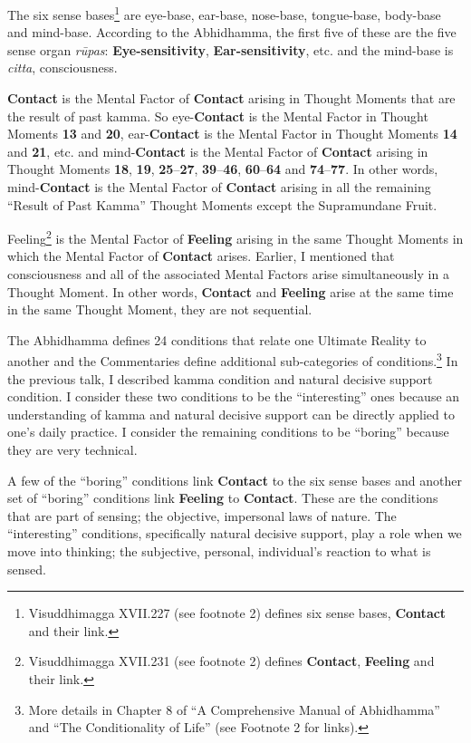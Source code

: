 The six sense bases\footnote{Visuddhimagga XVII.227 (see footnote 2) defines six sense bases, \textbf{Contact} and their link.} are eye-base, ear-base, nose-base, tongue-base, body-base and mind-base. According to the Abhidhamma, the first five of these are the five sense organ \textit{rūpas}: \textbf{Eye-sensitivity}, \textbf{Ear-sensitivity}, etc. and the mind-base is \textit{citta}, consciousness.

\textbf{Contact} is the Mental Factor of \textbf{Contact} arising in Thought Moments that are the result of past kamma. So eye-\textbf{Contact} is the Mental Factor in Thought Moments \textbf{13} and \textbf{20}, ear-\textbf{Contact} is the Mental Factor in Thought Moments \textbf{14} and \textbf{21}, etc. and mind-\textbf{Contact} is the Mental Factor of \textbf{Contact} arising in Thought Moments \textbf{18}, \textbf{19}, \textbf{25}--\textbf{27}, \textbf{39}--\textbf{46}, \textbf{60}--\textbf{64} and \textbf{74}--\textbf{77}. In other words, mind-\textbf{Contact} is the Mental Factor of \textbf{Contact} arising in all the remaining “Result of Past Kamma” Thought Moments except the Supramundane Fruit.

Feeling\footnote{Visuddhimagga XVII.231 (see footnote 2) defines \textbf{Contact}, \textbf{Feeling} and their link.} is the Mental Factor of \textbf{Feeling} arising in the same Thought Moments in which the Mental Factor of \textbf{Contact} arises. Earlier, I mentioned that consciousness and all of the associated Mental Factors arise simultaneously in a Thought Moment. In other words, \textbf{Contact} and \textbf{Feeling} arise at the same time in the same Thought Moment, they are not sequential.

The Abhidhamma defines 24 conditions that relate one Ultimate Reality to another and the Commentaries define additional sub-categories of conditions.\footnote{More details in Chapter 8 of “A Comprehensive Manual of Abhidhamma” and “The Conditionality of Life” (see Footnote 2 for links).} In the previous talk, I described kamma condition and natural decisive support condition. I consider these two conditions to be the “interesting” ones because an understanding of kamma and natural decisive support can be directly applied to one’s daily practice. I consider the remaining conditions to be “boring” because they are very technical.

A few of the “boring” conditions link \textbf{Contact} to the six sense bases and another set of “boring” conditions link \textbf{Feeling} to \textbf{Contact}. These are the conditions that are part of sensing; the objective, impersonal laws of nature. The “interesting” conditions, specifically natural decisive support, play a role when we move into thinking; the subjective, personal, individual’s reaction to what is sensed.

